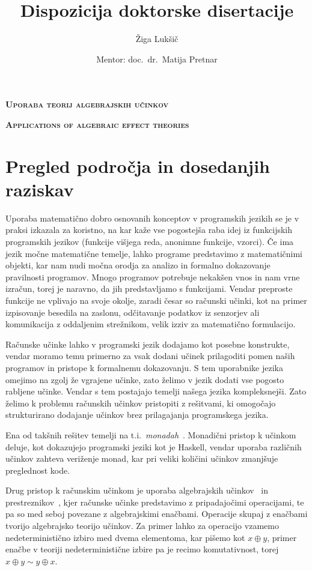 \documentclass{article}
\title{Dispozicija doktorske disertacije}
\author{Žiga Lukšič \and Mentor: doc.\ dr.\ Matija Pretnar}
\date{}
\begin{document}
\maketitle

\vspace{-10mm}
\begin{center}
  \Large{\textsc{\textbf{Uporaba teorij algebrajskih učinkov}}}

  \Large{\textsc{\textbf{Applications of algebraic effect theories}}}
\end{center}

\section*{Pregled področja in dosedanjih raziskav}

Uporaba matematično dobro osnovanih konceptov v programskih jezikih se je v praksi izkazala za koristno, na kar kaže vse pogostejša raba idej iz funkcijskih programskih jezikov (funkcije višjega reda, anonimne funkcije, vzorci). Če ima jezik močne matematične temelje, lahko programe predstavimo z matematičnimi objekti, kar nam nudi močna orodja za analizo in formalno dokazovanje pravilnosti programov. Mnogo programov potrebuje nekakšen vnos in nam vrne izračun, torej je naravno, da jih predstavljamo s funkcijami. Vendar preproste funkcije ne vplivajo na svoje okolje, zaradi česar so računski učinki, kot na primer izpisovanje besedila na zaslonu, odčitavanje podatkov iz senzorjev ali komunikacija z oddaljenim strežnikom, velik izziv za matematično formulacijo.

Računske učinke lahko v programski jezik dodajamo kot posebne konstrukte, vendar moramo temu primerno za vsak dodani učinek prilagoditi pomen naših programov in pristope k formalnemu dokazovanju. S tem uporabnike jezika omejimo na zgolj že vgrajene učinke, zato želimo v jezik dodati vse pogosto rabljene učinke. Vendar s tem postajajo temelji našega jezika kompleksnejši. Zato želimo k problemu računskih učinkov pristopiti z rešitvami, ki omogočajo strukturirano dodajanje učinkov brez prilagajanja programskega jezika.

Ena od takšnih rešitev temelji na t.i.\ \emph{monadah}~\cite{DBLP:journals/iandc/Moggi91}. Monadični pristop k učinkom deluje, kot dokazujejo programski jeziki kot je Haskell, vendar uporaba različnih učinkov zahteva veriženje monad, kar pri veliki količini učinkov zmanj\-šuje preglednost kode.

Drug pristop k računskim učinkom je uporaba algebrajskih učinkov~\cite{DBLP:conf/fossacs/PlotkinP01, DBLP:journals/acs/PlotkinP03} in prestreznikov~\cite{DBLP:conf/esop/PlotkinP09}, kjer računske učinke predstavimo z pripadajočimi operacijami, te pa so med seboj povezane z algebrajskimi enačbami. Operacije skupaj z enačbami tvorijo algebrajsko teorijo učinkov. Za primer lahko za operacijo vzamemo nedeterministično izbiro med dvema elementoma, kar pišemo kot $x \oplus y$, primer enačbe v teoriji nedeterministične izbire pa je recimo komutativnost, torej $x \oplus y \sim y \oplus x$.
\end{document}
